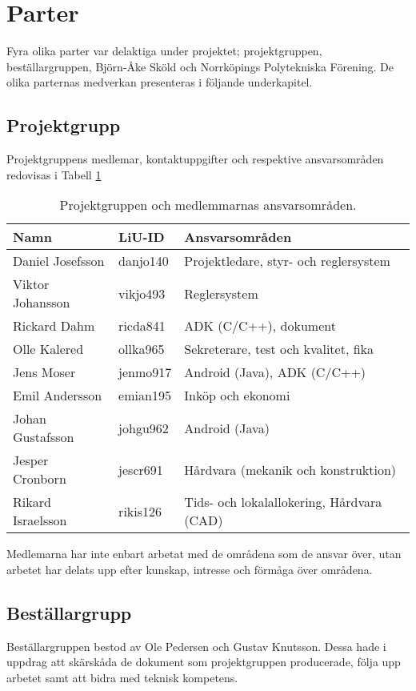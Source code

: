 \section{Parter}
Fyra olika parter var delaktiga under projektet; projektgruppen,
beställargruppen, Björn-Åke Sköld och Norrköpings Polytekniska Förening. De
olika parternas medverkan presenteras i följande underkapitel.

\subsection{Projektgrupp}
Projektgruppens medlemar, kontaktuppgifter och respektive ansvarsområden
redovisas i Tabell \ref{tbl:projektgruppen}

\begin{table}[htbp!]
\label{tbl:projektgruppen}
\caption{Projektgruppen och medlemmarnas ansvarsområden.}
\centering
\begin{tabular}{|l|l|p{}|}
\hline
Namn & LiU-ID & Ansvarsområden \\
\hline
\hline
Daniel Josefsson & danjo140 & Projektledare, styr- och reglersystem \\
Viktor Johansson & vikjo493 & Reglersystem \\
Rickard Dahm & ricda841 & ADK (C/C++), dokument \\
Olle Kalered & ollka965 & Sekreterare, test och kvalitet, fika \\
Jens Moser & jenmo917 & Android (Java), ADK (C/C++) \\
Emil Andersson & emian195 & Inköp och ekonomi \\
Johan Gustafsson & johgu962 & Android (Java) \\
Jesper Cronborn & jescr691 & Hårdvara (mekanik och konstruktion)\\
Rikard Israelsson & rikis126 & Tids- och lokalallokering, \newline 
Hårdvara (CAD) \\
\hline
\end{tabular}
\end{table}

Medlemarna har inte enbart arbetat med de områdena som de ansvar över, utan
arbetet har delats upp efter kunskap, intresse och förmåga över områdena.

\subsection{Beställargrupp}
Beställargruppen bestod av Ole Pedersen och Gustav Knutsson. Dessa hade i
uppdrag att skärskåda de dokument som projektgruppen producerade, följa upp
arbetet samt att bidra med teknisk kompetens.

